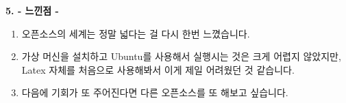\documentclass{article}
\begin{document}
\newpage
\begin{large}\textbf{5. - 느낀점 -}\end{large}
\begin{enumerate}
\item 오픈소스의 세계는 정말 넓다는 걸 다시 한번 느꼈습니다.
\item 가상 머신을 설치하고 Ubuntu를 사용해서 실행시는 것은 크게 어렵지 않았지만, Latex 자체를 처음으로 사용해봐서
이게 제일 어려웠던 것 같습니다.
\item 다음에 기회가 또 주어진다면 다른 오픈소스를 또 해보고 싶습니다.
\end{enumerate}
\end{document}
